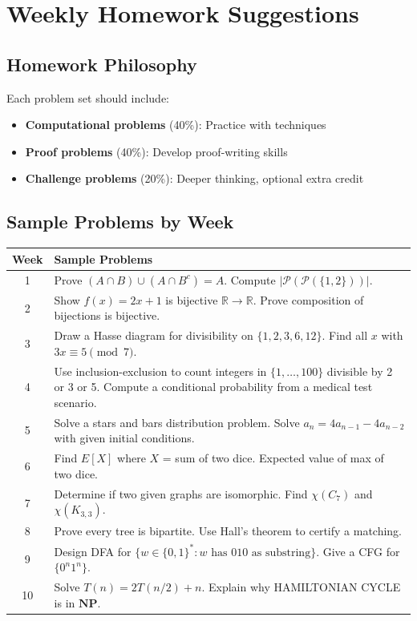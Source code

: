 \documentclass[11pt]{article}
\begin{document}
\newpage
\section{Weekly Homework Suggestions}

\subsection{Homework Philosophy}
Each problem set should include:
\begin{itemize}
    \item \textbf{Computational problems} (40\%): Practice with techniques
    \item \textbf{Proof problems} (40\%): Develop proof-writing skills
    \item \textbf{Challenge problems} (20\%): Deeper thinking, optional extra credit
\end{itemize}

\subsection{Sample Problems by Week}

\begin{center}
\begin{tabularx}{\textwidth}{cX}
\toprule
\textbf{Week} & \textbf{Sample Problems} \\
\midrule
1 & Prove $(A \cap B) \cup (A \cap B^c) = A$. Compute $|\mathcal{P}(\mathcal{P}(\{1,2\}))|$. \\
2 & Show $f(x) = 2x + 1$ is bijective $\mathbb{R} \to \mathbb{R}$. Prove composition of bijections is bijective. \\
3 & Draw a Hasse diagram for divisibility on $\{1,2,3,6,12\}$. Find all $x$ with $3x \equiv 5 \pmod{7}$. \\
4 & Use inclusion-exclusion to count integers in $\{1,\ldots,100\}$ divisible by 2 or 3 or 5. Compute a conditional probability from a medical test scenario. \\
5 & Solve a stars and bars distribution problem. Solve $a_n = 4a_{n-1} - 4a_{n-2}$ with given initial conditions. \\
6 & Find $E[X]$ where $X$ = sum of two dice. Expected value of max of two dice. \\
7 & Determine if two given graphs are isomorphic. Find $\chi(C_7)$ and $\chi(K_{3,3})$. \\
8 & Prove every tree is bipartite. Use Hall's theorem to certify a matching. \\
9 & Design DFA for $\{w \in \{0,1\}^* : w \text{ has 010 as substring}\}$. Give a CFG for $\{0^n1^n\}$. \\
10 & Solve $T(n) = 2T(n/2) + n$. Explain why HAMILTONIAN CYCLE is in $\mathbf{NP}$. \\
\bottomrule
\end{tabularx}
\end{center}
\end{document}

